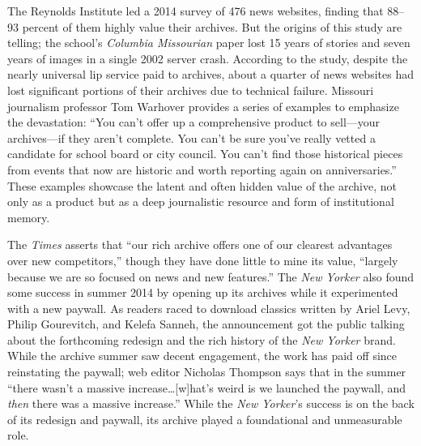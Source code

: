 

The Reynolds Institute led a 2014 survey of 476 news websites, finding that 88--93 percent of them highly value their archives. But the origins of this study are telling; the school's \emph{Columbia Missourian} paper lost 15 years of stories and seven years of images in a single 2002 server crash. According to the study, despite the nearly universal lip service paid to archives, about a quarter of news websites had lost significant portions of their archives due to technical failure. Missouri journalism professor Tom Warhover provides a series of examples to emphasize the devastation: ``You can't offer up a comprehensive product to sell---your archives---if they aren't complete. You can't be sure you've really vetted a candidate for school board or city council. You can't find those historical pieces from events that now are historic and worth reporting again on anniversaries.''\autocite{mccain_saving_2014} These examples showcase the latent and often hidden value of the archive, not only as a product but as a deep journalistic resource and form of institutional memory.

The \emph{Times} asserts that ``our rich archive offers one of our clearest advantages over new competitors,'' though they have done little to mine its value, ``largely because we are so focused on news and new features.''\autocite[28]{_innovation_2014}  The \emph{New Yorker} also found some success in summer 2014 by opening up its archives while it experimented with a new paywall. As readers raced to download classics written by Ariel Levy, Philip Gourevitch, and Kelefa Sanneh, the announcement got the public talking about the forthcoming redesign and the rich history of the \emph{New Yorker} brand. While the archive summer saw decent engagement, the work has paid off since reinstating the paywall; web editor Nicholas Thompson says that in the summer ``there wasn't a massive increase\ldots[w]hat's weird is we launched the paywall, and \emph{then} there was a massive increase.''\autocite{ellis_after_2015} While the \emph{New Yorker}'s success is on the back of its redesign and paywall, its archive played a foundational and unmeasurable role.

